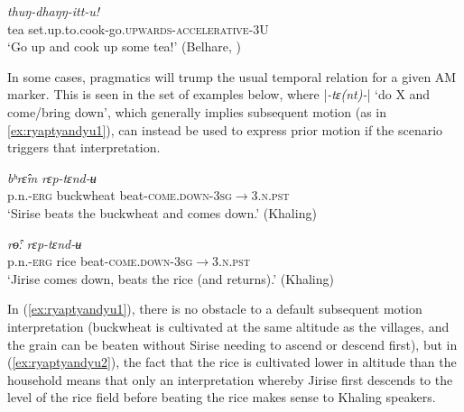 \documentclass[oneside,a4paper,11pt]{article}
\newcommand{\ipa}[1]{{\phon\textit{#1}}}
\newcommand{\sens}[1]{‘#1’}
\newcommand{\rouge}[1]{{\color{red}#1}}
\newcommand{\dhatu}[2]{|\ipa{#1}| `#2'}
\begin{document}
 \begin{exe}
\ex \label{ex:thuNdhaNNittu}
 \gll   \ipa{cia}	\ipa{thuŋ-\rouge{dhaŋŋ}-itt-u!} \\
 tea set.up.to.cook-\rouge{go.\textsc{upwards}}-\textsc{accelerative}-3U \\
\glt \sens{Go up and cook up some tea!} (Belhare, \citealt[73]{bickel99spatial})
 \end{exe}

In some cases, pragmatics will trump the usual temporal relation for a given AM marker.  This is seen in the set of examples below, where  \dhatu{-tɛ(nt)-}{do X and come/bring down}, which  generally implies subsequent motion (as in \ref{ex:ryaptyandyu1}), can instead be used to express prior motion if the scenario triggers that interpretation.  

 \begin{exe}
\ex \label{ex:ryaptyandyu1}
  \gll   \ipa{siriseʔ-ɛ} \ipa{bʰrɛ̂m}  \ipa{rɛp-\rouge{tɛnd}-ʉ} \\
   p.n.-\textsc{erg} buckwheat beat-\textsc{\rouge{come.down}}-\textsc{3sg$\rightarrow$3.n.pst} \\
\glt `Sirise beats the buckwheat and comes down.'  (Khaling)
 \end{exe}
 
 
 \begin{exe}
\ex \label{ex:ryaptyandyu2}
 \gll   \ipa{dzirise-ʔɛ} \ipa{rɵ̂ː} \ipa{rɛp-\rouge{tɛnd}-ʉ} \\
 p.n.-\textsc{erg} rice beat-\textsc{\rouge{come.down}}-\textsc{3sg$\rightarrow$3.n.pst} \\
\glt `Jirise comes down, beats the rice (and returns).'  (Khaling)
 \end{exe}

In (\ref{ex:ryaptyandyu1}), there is no obstacle to a default subsequent motion interpretation (buckwheat is cultivated at the same altitude as the villages, and the grain can be beaten without Sirise needing to ascend or descend first), but in (\ref{ex:ryaptyandyu2}), the fact that the rice is cultivated lower in altitude than the household means that only an interpretation whereby Jirise first descends to the level of the rice field before beating the rice makes sense to Khaling speakers. 

\end{document}
